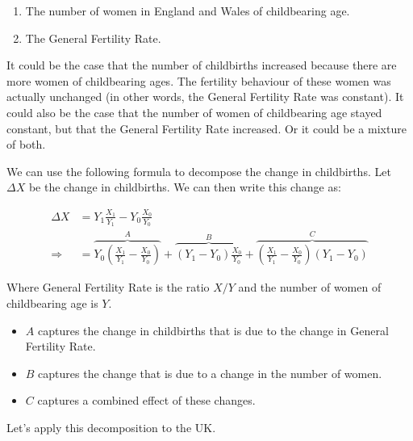 \documentclass[
]{book}
\providecommand{\tightlist}{%
  \setlength{\itemsep}{0pt}\setlength{\parskip}{0pt}}
\begin{document}
\begin{enumerate}
\def\labelenumi{\arabic{enumi}.}
\tightlist
\item
  The number of women in England and Wales of childbearing age.
\item
  The General Fertility Rate.
\end{enumerate}

It could be the case that the number of childbirths increased because there are more women of childbearing ages. The fertility behaviour of these women was actually unchanged (in other words, the General Fertility Rate was constant). It could also be the case that the number of women of childbearing age stayed constant, but that the General Fertility Rate increased. Or it could be a mixture of both.

We can use the following formula to decompose the change in childbirths. Let \(\Delta X\) be the change in childbirths. We can then write this change as:

\begin{align}
    \Delta X&=Y_1\frac{X_1}{Y_1}-Y_0\frac{X_0}{Y_0}\nonumber\\
\Rightarrow &=\overbrace{Y_0\left(\frac{X_1}{Y_1}-\frac{X_0}{Y_0}\right)}^{A}+\overbrace{\left(Y_1-Y_0\right)\frac{X_0}{Y_0}}^{B}+
    \overbrace{\left(\frac{X_1}{Y_1}-\frac{X_0}{Y_0}\right)\left(Y_1-Y_0\right)}^{C}
\end{align}

Where General Fertility Rate is the ratio \(X/Y\) and the number of women of childbearing age is \(Y\).

\begin{itemize}
\tightlist
\item
  \(A\) captures the change in childbirths that is due to the change in General Fertility Rate.
\item
  \(B\) captures the change that is due to a change in the number of women.
\item
  \(C\) captures a combined effect of these changes.
\end{itemize}

Let's apply this decomposition to the UK.
\end{document}
